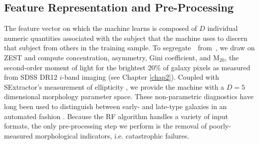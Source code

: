 \subsection{Feature Representation and Pre-Processing}
The feature vector on which the machine learns is composed of $D$ individual 
numeric quantities associated with the subject that the machine uses to discern 
that subject from others in the training sample. 
To segregate~\feat~from~\notfeat, we draw on ZEST \citep{Scarlata2007} and compute
 concentration, asymmetry, Gini coefficient, and M$_{20}$, 
the second-order moment of light for the brightest 20\% of galaxy pixels as
measured from SDSS DR12 $i$-band imaging (see Chapter \ref{chap2}). 
Coupled with SExtractor's measurement of ellipticity \citep{sextractor}, 
we provide the machine with a $D=5$ dimensional morphology parameter space.
These non-parametric diagnostics have long been used to distinguish between early- and late-type galaxies 
in an automated fashion \cite[e.g.,][]{Abraham1996, Bershady2000, Conselice2000, Abraham2003, Conselice2003, Lotz2004, Snyder2015}.
Because the RF algorithm handles a variety of input formats, the only pre-processing 
step we perform is the removal of poorly-measured morphological indicators, i.e. catastrophic failures.




